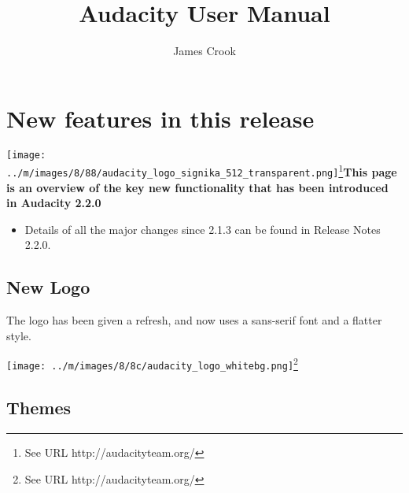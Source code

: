 \documentclass[twocolumn]{book}
\begin{document}
{\let\cleardoublepage\clearpage 
\title{Audacity User Manual}
\author{James Crook}
}


																					
\chapter{New features in this release}

\label{f0}																																	%
					

\texttt{[image: ../m/images/8/88/audacity\_logo\_signika\_512\_transparent.png]}\footnote{See URL http://audacityteam.org/}\newline\textbf{This page is an overview of the key new functionality that has been introduced in Audacity 2.2.0}
\begin{itemize}
\item  Details of all the major changes since 2.1.3 can be found in Release Notes 2.2.0.
\end{itemize}





\section{New Logo}


The logo has been given a refresh, and now uses a sans-serif font and a flatter style.

\texttt{[image: ../m/images/8/8c/audacity\_logo\_whitebg.png]}\footnote{See URL http://audacityteam.org/}


\section{Themes}
\end{document}
